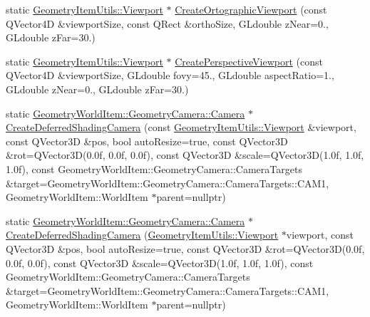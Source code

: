 \begin{DoxyCompactItemize}
\item 
static \mbox{\hyperlink{class_geometry_engine_1_1_geometry_item_utils_1_1_viewport}{Geometry\+Item\+Utils\+::\+Viewport}} $\ast$ \mbox{\hyperlink{class_geometry_engine_1_1_geometry_factory_a27855bee8a087a66034ee5001a023241}{Create\+Ortographic\+Viewport}} (const Q\+Vector4D \&viewport\+Size, const Q\+Rect \&ortho\+Size, G\+Ldouble z\+Near=0., G\+Ldouble z\+Far=30.)
\item 
static \mbox{\hyperlink{class_geometry_engine_1_1_geometry_item_utils_1_1_viewport}{Geometry\+Item\+Utils\+::\+Viewport}} $\ast$ \mbox{\hyperlink{class_geometry_engine_1_1_geometry_factory_ab29bf1ed42ffb4054a8d19c292bcbaea}{Create\+Perspective\+Viewport}} (const Q\+Vector4D \&viewport\+Size, G\+Ldouble fovy=45., G\+Ldouble aspect\+Ratio=1., G\+Ldouble z\+Near=0., G\+Ldouble z\+Far=30.)
\item 
static \mbox{\hyperlink{class_geometry_engine_1_1_geometry_world_item_1_1_geometry_camera_1_1_camera}{Geometry\+World\+Item\+::\+Geometry\+Camera\+::\+Camera}} $\ast$ \mbox{\hyperlink{class_geometry_engine_1_1_geometry_factory_ac6b3dc56e3cc3ce41a0b1e8d95566d75}{Create\+Deferred\+Shading\+Camera}} (const \mbox{\hyperlink{class_geometry_engine_1_1_geometry_item_utils_1_1_viewport}{Geometry\+Item\+Utils\+::\+Viewport}} \&viewport, const Q\+Vector3D \&pos, bool auto\+Resize=true, const Q\+Vector3D \&rot=Q\+Vector3D(0.\+0f, 0.\+0f, 0.\+0f), const Q\+Vector3\+D \&scale=\+Q\+Vector3\+D(1.\+0f, 1.\+0f, 1.\+0f), const Geometry\+World\+Item\+::\+Geometry\+Camera\+::\+Camera\+Targets \&target=\+Geometry\+World\+Item\+::\+Geometry\+Camera\+::\+Camera\+Targets\+::\+C\+A\+M1, Geometry\+World\+Item\+::\+World\+Item $\ast$parent=nullptr)
\item 
static \mbox{\hyperlink{class_geometry_engine_1_1_geometry_world_item_1_1_geometry_camera_1_1_camera}{Geometry\+World\+Item\+::\+Geometry\+Camera\+::\+Camera}} $\ast$ \mbox{\hyperlink{class_geometry_engine_1_1_geometry_factory_afbfcaa9d976ed404393d9d87ac096665}{Create\+Deferred\+Shading\+Camera}} (\mbox{\hyperlink{class_geometry_engine_1_1_geometry_item_utils_1_1_viewport}{Geometry\+Item\+Utils\+::\+Viewport}} $\ast$viewport, const Q\+Vector3D \&pos, bool auto\+Resize=true, const Q\+Vector3D \&rot=Q\+Vector3D(0.\+0f, 0.\+0f, 0.\+0f), const Q\+Vector3\+D \&scale=\+Q\+Vector3\+D(1.\+0f, 1.\+0f, 1.\+0f), const Geometry\+World\+Item\+::\+Geometry\+Camera\+::\+Camera\+Targets \&target=\+Geometry\+World\+Item\+::\+Geometry\+Camera\+::\+Camera\+Targets\+::\+C\+A\+M1, Geometry\+World\+Item\+::\+World\+Item $\ast$parent=nullptr)

\end{DoxyCompactItemize}
